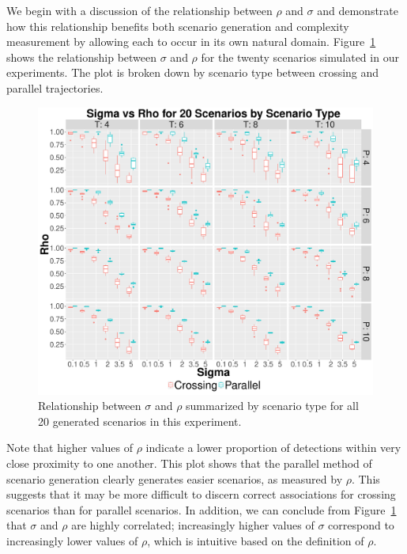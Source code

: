 We begin with a discussion of the relationship between $\rho$ and $\sigma$ and demonstrate how this relationship benefits both scenario generation and complexity measurement by allowing each to occur in its own natural domain. Figure~\ref{fig:Sigma_vs_Rho} shows the relationship between $\sigma$ and $\rho$ for the twenty scenarios simulated in our experiments. The plot is broken down by scenario type between crossing and parallel trajectories. 
\begin{figure}[ht]
  \centering
  \includegraphics[width=\columnwidth]{../Figures//Sigma_vs_Rho}
    \caption{Relationship between $\sigma$ and $\rho$ summarized by scenario type for all 20 generated scenarios in this experiment.}
    \label{fig:Sigma_vs_Rho}
\end{figure}

Note that higher values of $\rho$ indicate a lower proportion of detections within very close proximity to one another. This plot shows that the parallel method of scenario generation clearly generates easier scenarios, as measured by $\rho$. This suggests that it may be more difficult to discern correct associations for crossing scenarios than for parallel scenarios. In addition, we can conclude from Figure~\ref{fig:Sigma_vs_Rho} that $\sigma$ and $\rho$ are highly correlated; increasingly higher values of $\sigma$ correspond to increasingly lower values of $\rho$, which is intuitive based on the definition of $\rho$. 

